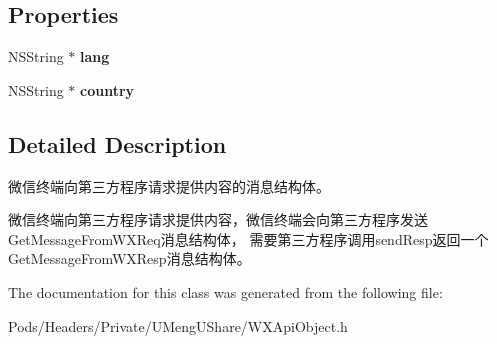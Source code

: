 \subsection*{Properties}
\begin{DoxyCompactItemize}
\item 
\mbox{\label{interface_get_message_from_w_x_req_adb7f38a6c14e7cc83d383f6acfe5806a}} 
N\+S\+String $\ast$ {\bfseries lang}
\item 
\mbox{\label{interface_get_message_from_w_x_req_ac35a0db29e2260abe3f0d4989d5ad6c8}} 
N\+S\+String $\ast$ {\bfseries country}
\end{DoxyCompactItemize}


\subsection{Detailed Description}
微信终端向第三方程序请求提供内容的消息结构体。 

微信终端向第三方程序请求提供内容，微信终端会向第三方程序发送\+Get\+Message\+From\+W\+X\+Req消息结构体， 需要第三方程序调用send\+Resp返回一个\+Get\+Message\+From\+W\+X\+Resp消息结构体。 

The documentation for this class was generated from the following file\+:\begin{DoxyCompactItemize}
\item 
Pods/\+Headers/\+Private/\+U\+Meng\+U\+Share/W\+X\+Api\+Object.\+h\end{DoxyCompactItemize}
